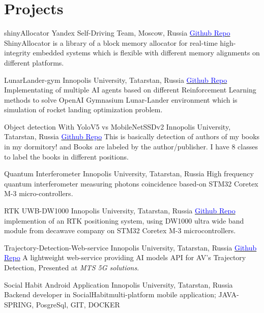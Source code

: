 \section{Projects}

    {shinyAllocator}
    {Yandex Self-Driving Team, Moscow, Russia}{}{}
    {\href{https://github.com/Ehsan2754/ShinyAllocator}{\textcolor{blue}{Github Repo}}  
    ShinyAllocator is a library of a block memory allocator for real-time high-integrity embedded systems which is flexible with different memory alignments on different platforms.  }
    
    {LunarLander-gym}
    {Innopolis University, Tatarstan, Russia}{}{}
    {\href{https://github.com/Ehsan2754/lunarlander_gym}{\textcolor{blue}{Github Repo}}  
    Implementating of multiple AI agents based on different Reinforcement Learning methods to solve OpenAI Gymnasium Lunar-Lander environment which is simulation of rocket landing optimization problem.  }
    
    {Object detection With YoloV5 vs MobileNetSSDv2}
    {Innopolis University, Tatarstan, Russia}{}{}
    {\href{https://github.com/Ehsan2754/ObjectDetection}{\textcolor{blue}{Github Repo}}  
   This is basically detection of authors of my books in my dormitory! and Books are labeled by the author/publisher. I have 8 classes to label the books in different positions.}
    

    {Quantum Interferometer}
    {Innopolis University, Tatarstan, Russia}{}{}
    {High frequency quantum interferometer measuring photons coincidence based-on STM32 Coretex M-3 micro-controllers.}
    
    {RTK UWB-DW1000}
    {Innopolis University, Tatarstan, Russia}{}{}
    {\href{https://github.com/Ehsan2754/RTK-DW1000/tree/main/Client}{\textcolor{blue}{Github Repo}}  implemention of an RTK positioning system, using DW1000 ultra wide band module from decawave company on STM32 Coretex M-3 microcontrollers.}

    {Trajectory-Detection-Web-service }
    {Innopolis University, Tatarstan, Russia}{}{}
    {\href{https://github.com/Ahuratus/Trajectory-Detection-Web-services}{\textcolor{blue}{Github Repo}} A lightweight web-service providing AI models API for AV's Trajectory Detection, Presented  at \textit{MTS 5G solutions}. }

    {Social Habit Android Application}
    {Innopolis University, Tatarstan, Russia}{}{}
    {Backend developer in SocialHabit\texttrademark multi-platform mobile application; JAVA-SPRING, PosgreSql, GIT, DOCKER}
    

